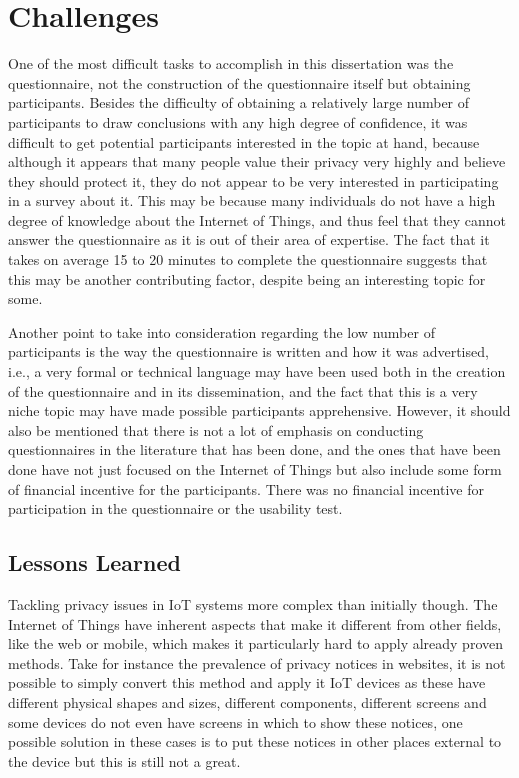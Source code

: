 %
%
\section{Challenges}

One of the most difficult tasks to accomplish in this dissertation was the
questionnaire, not the construction of the questionnaire itself but
obtaining participants. Besides the difficulty of obtaining a relatively
large number of participants to draw conclusions with any high degree of
confidence, it was difficult to get potential participants interested in the topic
at hand, because although it appears that many people value their privacy very
highly and believe they should protect it, they do not appear to be very
interested in participating in a survey about it.
This may be because many individuals do not have a high degree of knowledge
about the Internet of Things, and thus feel that they cannot answer the
questionnaire as it is out of their area of expertise. The fact that
it takes on average 15 to 20 minutes to complete the questionnaire suggests
that this may be another contributing factor, despite being an interesting
topic for some.

Another point to take into consideration regarding the low
number of participants is the way the questionnaire is written and how
it was advertised, i.e., a very formal or technical language may have
been used both in the creation of the questionnaire and in its
dissemination, and the fact that this is a very niche topic may have
made possible participants apprehensive. However, it should also be mentioned
that there is not a lot of emphasis on conducting questionnaires in the
literature that has been done, and the ones that have been done have not
just focused on the Internet of Things but also include some form of financial
incentive for the participants. There was no financial incentive for
participation in the questionnaire or the usability test.

\subsection{Lessons Learned}

Tackling privacy issues in IoT systems more complex than initially though.
The Internet of Things have inherent aspects that make it different from
other fields, like the web or mobile, which makes it particularly hard
to apply already proven methods. Take for instance the prevalence of
privacy notices in websites, it is not possible to simply convert this
method and apply it IoT devices as these have different physical shapes and sizes,
different components, different screens and some devices do not even have screens
in which to show these notices, one possible solution in these cases is to
put these notices in other places external to the device but this is still not
a great.

